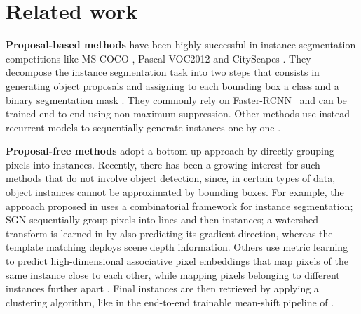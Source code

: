 
\section{Related work} \label{sec:related_work}
\textbf{Proposal-based methods} have been highly successful in instance segmentation competitions like MS COCO \cite{lin2014microsoft}, Pascal VOC2012 \cite{everingham2010pascal} and CityScapes \cite{cordts2016cityscapes}. They decompose the instance segmentation task into two steps that consists in generating object proposals and assigning to each bounding box a class and a binary segmentation mask \cite{he2017mask,porzi2019seamless,liu2018path,yang2012layered,li2017fully,ladicky2010and,hariharan2014simultaneous,chen2015multi,dai2016instance,liang2016reversible}. 
They commonly rely on {Faster-RCNN}~\cite{ren2015faster} and can be trained end-to-end using non-maximum suppression. Other methods use instead recurrent models to sequentially generate instances one-by-one \cite{romera2016recurrent,ren2017end}.

\textbf{Proposal-free methods} adopt a bottom-up approach by directly grouping pixels into instances. Recently, there has been a growing interest for such  methods that do not involve object detection, since, in certain types of data, object instances cannot be approximated by bounding boxes. For example, the approach proposed in \cite{kirillov2017instancecut} uses a combinatorial framework for instance segmentation; SGN \cite{liu2017sgn} sequentially group pixels into lines and then instances;
a watershed transform is learned in \cite{bai2017deep} by also predicting its gradient direction, whereas the template matching \cite{uhrig2016pixel} deploys scene depth information.
Others use metric learning to predict high-dimensional associative pixel embeddings that map pixels of the same instance close to each other, while mapping pixels belonging to different instances further apart \cite{fathi2017semantic,newell2017associative,de2017semantic}. %
Final instances are then retrieved by applying a clustering algorithm, like in the end-to-end trainable mean-shift pipeline of \cite{kong2018recurrentPix}. 

